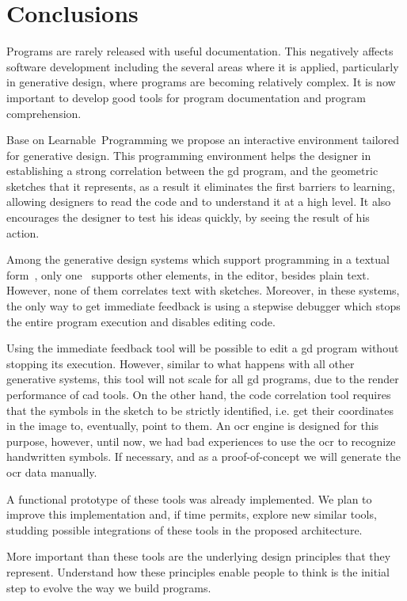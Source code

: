 
% 
% 

\section{Conclusions}
\label{sec:fin}

Programs are rarely released with useful documentation. This negatively affects software development including the several areas where it is applied, particularly in generative design, where programs are becoming relatively complex. It is now important to develop good tools for program documentation and program comprehension.

Base on Learnable~Programming we propose an interactive environment tailored for generative design. This programming environment helps the designer in establishing a strong correlation between the \ac{gd} program, and the geometric sketches that it represents, as a result it eliminates the first barriers to learning, allowing designers to read the code and to understand it at a high level. It also encourages the designer to test his ideas quickly, by seeing the result of his action.

Among the generative design systems which support programming in a textual form~\cite{aish2012designscript,lopes2011portable}, only one~\cite{lopes2011portable} supports other elements, in the editor, besides plain text. However, none of them correlates text with sketches. Moreover, in these systems, the only way to get immediate feedback is using a stepwise debugger which stops the entire program execution and disables editing code.

Using the immediate feedback tool will be possible to edit a \ac{gd} program without stopping its execution. However, similar to what happens with all other generative systems, this tool will not scale for all \ac{gd} programs, due to the render performance of \ac{cad} tools. On the other hand, the code correlation tool requires that the symbols in the sketch to be strictly identified, i.e. get their coordinates in the image to, eventually, point to them. An \ac{ocr} engine is designed for this purpose, however, until now, we had bad experiences to use the \ac{ocr} to recognize handwritten symbols. If necessary, and as a proof-of-concept we will generate the \ac{ocr} data manually.

A functional prototype of these tools was already implemented. We plan to improve this implementation and, if time permits, explore new similar tools, studding possible integrations of these tools in the proposed architecture.

More important than these tools are the underlying design principles that they represent. Understand how these principles enable people to think is the initial step to evolve the way we build programs.